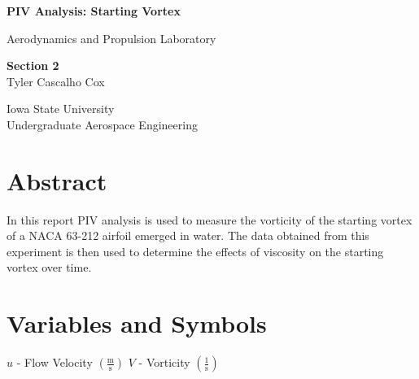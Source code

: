 \documentclass[12pt]{article}
\begin{document}
\begin{titlepage}
    \begin{center}
        \vspace*{1cm}
            
        \LARGE
        \textbf{PIV Analysis: Starting Vortex}
            
        \vspace{0.5cm}
        \Large
        Aerodynamics and Propulsion
Laboratory 
            
        \vspace{1.5cm}
        \large
        \textbf{Section 2}\\
        \normalsize\vspace{15 pt}
        Tyler Cascalho Cox\\
        \vfill
            
            
        \vspace{0.8cm}
            
            
        \Large
        Iowa State University\\
        Undergraduate Aerospace Engineering
        
            
    \end{center}
\end{titlepage}


\pagestyle{fancy}
\fancyfoot[CE,CO]{\leftmark}
\fancyfoot[LE,RO]{\thepage}


\section*{Abstract}
In this report PIV analysis is used to measure the vorticity of the starting vortex of a NACA 63-212 airfoil emerged in water. The data obtained from this experiment is then used to determine the effects of viscosity on the starting vortex over time.
\newline
\section*{Variables and Symbols}
\(u\) - Flow Velocity \(\left(\frac{\mbox{m}}{\mbox{s}}\right)\)\newline\newline
\(V\) - Vorticity \(\left(\frac{1}{{\mbox{s}}}\right)\) \newline\newline
\end{document}
